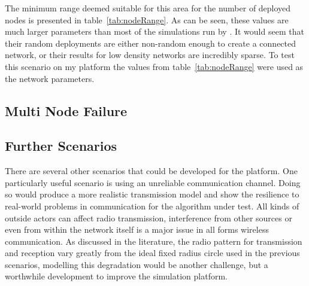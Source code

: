 \documentclass[authoryearcitations]{UoYCSproject}
\begin{document}
\begin{table}[]
\centering
{}
\caption{Minimum ranges for number of randomly deployed nodes in a 1000x1000 unit area.}
\label{tab:nodeRange}
\end{table}

The minimum range deemed suitable for this area for the number of deployed nodes is presented in table~\ref{tab:nodeRange}. As can be seen, these values are much larger parameters than most of the simulations run by \citeauthor*{Younis2010}. It would seem that their random deployments are either non-random enough to create a connected network, or their results for low density networks are incredibly sparse. To test this scenario on my platform the values from table~\ref{tab:nodeRange} were used as the network parameters.

\subsection{Multi Node Failure}

\subsection{Further Scenarios}

There are several other scenarios that could be developed for the platform. One particularly useful scenario is using an unreliable communication channel. Doing so would produce a more realistic transmission model and show the resilience to real-world problems in communication for the algorithm under test. All kinds of outside actors can affect radio transmission, interference from other sources or even from within the network itself is a major issue in all forms wireless communication. As discussed in the literature, the radio pattern for transmission and reception vary greatly from the ideal fixed radius circle used in the previous scenarios, modelling this degradation would be another challenge, but a worthwhile development to improve the simulation platform.
\end{document}
